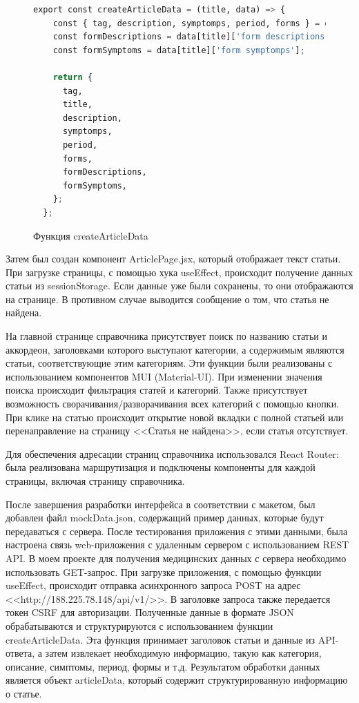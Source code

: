  \begin{figure}
 \begin{lstlisting}[language=Python]
export const createArticleData = (title, data) => {
    const { tag, description, symptomps, period, forms } = data[title];
    const formDescriptions = data[title]['form descriptions'];
    const formSymptoms = data[title]['form symptomps'];
  
    return {
      tag,
      title,
      description,
      symptomps,
      period,
      forms,
      formDescriptions,
      formSymptoms,
    };
  };
\end{lstlisting}
\caption{Функция createArticleData}
\label{src:src2}
\end{figure}

Затем был создан компонент ArticlePage.jsx, который отображает текст статьи. При загрузке страницы, с помощью хука useEffect, происходит получение данных статьи из sessionStorage. Если данные уже были сохранены, то они отображаются на странице. В противном случае выводится сообщение о том, что статья не найдена.

На главной странице справочника присутствует поиск по названию статьи и аккордеон, заголовками которого выступают категории, а содержимым являются статьи, соответствующие этим категориям. Эти функции были реализованы с использованием компонентов MUI (Material-UI). При изменении значения поиска происходит фильтрация статей и категорий. Также присутствует возможность сворачивания/разворачивания всех категорий с помощью кнопки. При клике на статью происходит открытие новой вкладки с полной статьей или перенаправление на страницу <<Статья не найдена>>, если статья отсутствует.

Для обеспечения адресации страниц справочника использовался React Router: была реализована маршрутизация и подключены компоненты для каждой страницы, включая страницу справочника.

После завершения разработки интерфейса в соответствии с макетом, был добавлен файл mockData.json, содержащий пример данных, которые будут передаваться с сервера. После тестирования приложения с этими данными, была настроена связь web-приложения с удаленным сервером с использованием REST API. В моем проекте для получения медицинских данных с сервера необходимо использовать GET-запрос. При загрузке приложения, с помощью функции useEffect, происходит отправка асинхронного запроса POST на адрес <<http://188.225.78.148/api/v1/>>. В заголовке запроса также передается токен CSRF для авторизации. Полученные данные в формате JSON обрабатываются и структурируются с использованием функции createArticleData. Эта функция принимает заголовок статьи и данные из API-ответа, а затем извлекает необходимую информацию, такую как категория, описание, симптомы, период, формы и т.д. Результатом обработки данных является объект articleData, который содержит структурированную информацию о статье.

